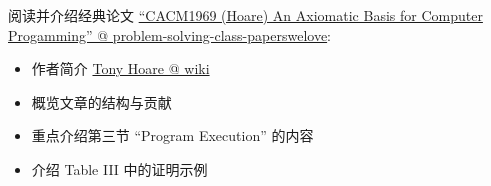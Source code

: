 \documentclass[a4paper, justified]{tufte-handout}
\begin{document}
\vspace{0.50cm}
\begin{ot}[程序设计语言的语义]
  阅读并介绍经典论文 
  \href{https://github.com/hengxin/problem-solving-class-paperswelove/tree/master/1st-semester}{``CACM1969 (Hoare) An Axiomatic Basis for Computer Progamming'' @ problem-solving-class-paperswelove}:

  \begin{itemize}
    \item 作者简介 \href{https://en.wikipedia.org/wiki/Tony\_Hoare}{Tony Hoare @ wiki}
    \item 概览文章的结构与贡献
    \item 重点介绍第三节 ``Program Execution'' 的内容
    \item 介绍 Table III 中的证明示例
  \end{itemize}
\end{ot}



\begincorrection


\beginfb

\end{document}
